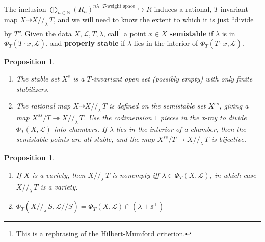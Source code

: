 \documentclass[10pt,a4paper]{amsart}
\newtheorem{proposition}[Thm]{Proposition}
\newcommand{\NN}{\mathbb{N}}
\newcommand\defn[1]{{\bf #1}}
\newcommand\Oplus\bigoplus
\newcommand\lie[1]{{\mathfrak #1}}
\newcommand\calL{{\mathcal L}}
\newcommand\into\hookrightarrow
\newcommand\onto\twoheadrightarrow
\begin{document}
The inclusion $ \Oplus_{n\in\NN} (R_n)^{\text{$n\lambda$ $T$-weight space}}
\into R$ induces a rational, $T$-invariant map
$X \dasharrow X//_\lambda\, T$, and we will need to know the extent to
which it is just ``divide by $T$''. Given the data $X,\calL,T,\lambda$,
call\footnote{This is a rephrasing of the Hilbert-Mumford criterion.}
a point $x\in X$ \defn{semistable} if $\lambda$ is in
$\Phi_T\left(\overline{T\cdot x},\calL\right)$,
and \defn{properly stable} if $\lambda$ lies in the interior of
$\Phi_T\left(\overline{T\cdot x},\calL\right)$.

\begin{proposition}\cite{brion1990action}\label{prop:brionprocesi}
  \begin{enumerate}
  \item The stable set $X^s$ is a $T$-invariant open set (possibly empty)
    with only finite stabilizers.
  \item The rational map $X \dasharrow X//_\lambda\, T$ is defined on
    the semistable set $X^{ss}$, giving a map $X^{ss}/T \onto X//_\lambda\, T$.
    Use the codimension $1$ pieces in the x-ray to divide
    $\Phi_T(X,\calL)$ into chambers. If $\lambda$ lies in the interior
    of a chamber, then the semistable points are all stable, 
    and the map $X^{ss}/T \to X//_\lambda\, T$ is bijective.
  \end{enumerate}
\end{proposition}

\begin{proposition}\label{prop:slicing}
  \begin{enumerate}
  \item If $X$ is a variety, then $X//_\lambda\, T$ is nonempty iff
    $\lambda \in \Phi_T(X,\calL)$, in which case $X//_\lambda\, T$ is a variety.
  \item $\Phi_T(X//_\lambda\, S, \calL//S)
    = \Phi_T(X,\calL) \cap (\lambda + \lie s^\perp)$
  \end{enumerate}
\end{proposition}
\end{document}
